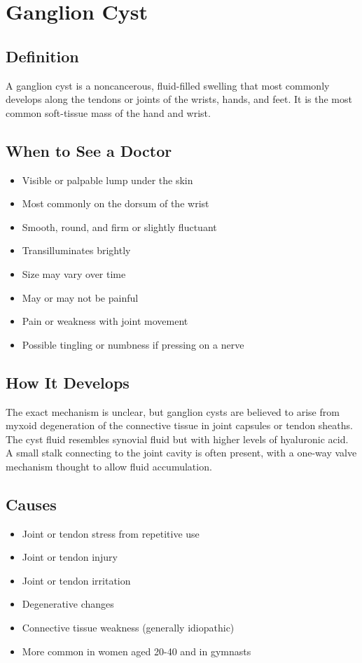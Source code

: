 \chapter{Ganglion Cyst}

\section*{Definition}
A ganglion cyst is a noncancerous, fluid-filled swelling that most commonly develops along the tendons or joints of the wrists, hands, and feet. It is the most common soft-tissue mass of the hand and wrist.

\section*{When to See a Doctor}
\begin{itemize}
\item Visible or palpable lump under the skin
\item Most commonly on the dorsum of the wrist
\item Smooth, round, and firm or slightly fluctuant
\item Transilluminates brightly
\item Size may vary over time
\item May or may not be painful
\item Pain or weakness with joint movement
\item Possible tingling or numbness if pressing on a nerve
\end{itemize}

\section*{How It Develops}
The exact mechanism is unclear, but ganglion cysts are believed to arise from myxoid degeneration of the connective tissue in joint capsules or tendon sheaths. The cyst fluid resembles synovial fluid but with higher levels of hyaluronic acid. A small stalk connecting to the joint cavity is often present, with a one-way valve mechanism thought to allow fluid accumulation.

\section*{Causes}
\begin{itemize}
\item Joint or tendon stress from repetitive use
\item Joint or tendon injury
\item Joint or tendon irritation
\item Degenerative changes
\item Connective tissue weakness (generally idiopathic)
\item More common in women aged 20-40 and in gymnasts
\end{itemize}


